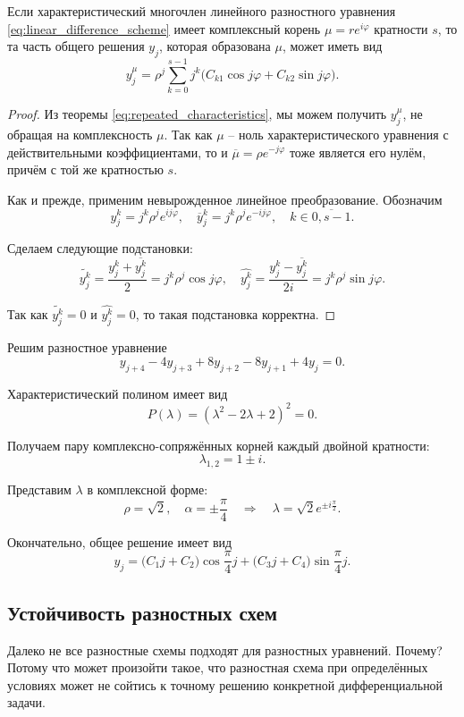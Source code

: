 \documentclass[../main.tex]{subfile}
\begin{document}
\begin{theorem}
	Если характеристический многочлен линейного разностного уравнения
	\eqref{eq:linear_difference_scheme} имеет комплексный корень
	$\mu=re^{i\varphi}$ кратности $s$, то та часть общего решения $y_j$,
	которая образована $\mu$, может иметь вид
	\[\boxed{y_j^\mu=\rho^j\sum_{k=0}^{s-1}j^k\big(C_{k1}\cos{j\varphi}+
	C_{k2}\sin{j\varphi}\big)}.\]
\end{theorem}

\begin{proof}
	Из теоремы \eqref{eq:repeated_characteristics}, мы можем получить
	$y_j^\mu$, не обращая на комплексность $\mu$. Так как $\mu$ -- ноль
	характеристического уравнения с действительными коэффициентами, то и
	$\overline{\mu}=\rho e^ {-j\varphi}$ тоже является его нулём, причём с
	той же кратностью $s$.

	Как и прежде, применим невырожденное линейное преобразование. Обозначим
	\[y_j^k=j^k\rho^je^{ij\varphi},\quad \overline{y}_j^k=j^k\rho^je^
	{-ij\varphi},\quad k\in\overline{0,s-1}.\]

	Сделаем следующие подстановки:
	\[\widetilde{y_j^k}=\frac{y_j^k+\overline{y_j^k}}{2}=j^k\rho^j\cos
	{j\varphi},\quad\widehat{y_j^k}=\frac{y_j^k-\overline{y_j^k}}{2i}=j^k
	\rho^j\sin{j\varphi}.\]

	Так как $\widetilde{y_j^k}=0$ и $\widehat{y_j^k}=0$, то такая
	подстановка корректна.
\end{proof}

\begin{example}
	Решим разностное уравнение
	\[y_{j+4}-4y_{j+3}+8y_{j+2}-8y_{j+1}+4y_j=0.\]

	Характеристический полином имеет вид
	\[P(\lambda)=(\lambda^2-2\lambda+2)^2=0.\]

	Получаем пару комплексно-сопряжённых корней каждый двойной кратности:
	\[\lambda_{1,2}=1\pm i.\]

	Представим $\lambda$ в комплексной форме:
	\[\rho=\sqrt{2},\quad\alpha=\pm\frac{\pi}{4}\quad\Rightarrow\quad
	\lambda=\sqrt{2}e^{\pm i\frac{\pi}{2}}.\]

	Окончательно, общее решение имеет вид
	\[y_j=\big(C_1j+C_2\big)\cos{\frac{\pi}{4}j}+\big(C_3j+C_4\big)
	\sin{\frac{\pi}{4}j}.\]
\end{example}

\subsection{Устойчивость разностных схем}
Далеко не все разностные схемы подходят для разностных уравнений. Почему?
Потому что может произойти такое, что разностная схема при определённых
условиях может не сойтись к точному решению конкретной дифференциальной
задачи.
\end{document}
